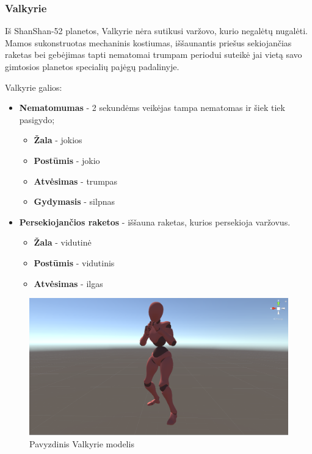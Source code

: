 \documentclass{VUMIFPSkursinis}
\begin{document}
\subsubsection{Valkyrie}
Iš ShanShan-52 planetos, Valkyrie nėra sutikusi varžovo, kurio negalėtų nugalėti. Mamos sukonstruotas mechaninis kostiumas, iššaunantis priešus sekiojančias raketas bei gebėjimas tapti nematomai trumpam periodui suteikė jai vietą savo gimtosios planetos specialių pajėgų padalinyje. 

Valkyrie galios:
\begin{itemize}
    \item \textbf{Nematomumas} - 2 sekundėms veikėjas tampa nematomas ir šiek tiek pasigydo;
    \begin{itemize}
        \item \textbf{Žala} - jokios
        \item \textbf{Postūmis} - jokio
        \item \textbf{Atvėsimas} - trumpas
        \item \textbf{Gydymasis} - silpnas
    \end{itemize}
    \item \textbf{Persekiojančios raketos} - iššauna raketas, kurios persekioja varžovus.
    \begin{itemize}
        \item \textbf{Žala} - vidutinė
        \item \textbf{Postūmis} - vidutinis
        \item \textbf{Atvėsimas} - ilgas
    \end{itemize}
\end{itemize}

\begin{figure}[H]
    \centering
    \includegraphics[scale=0.3]{img/Characters/Valkyrie.png}
    \caption{Pavyzdinis Valkyrie modelis}
    \label{img:valkyrie}
\end{figure}
\end{document}
